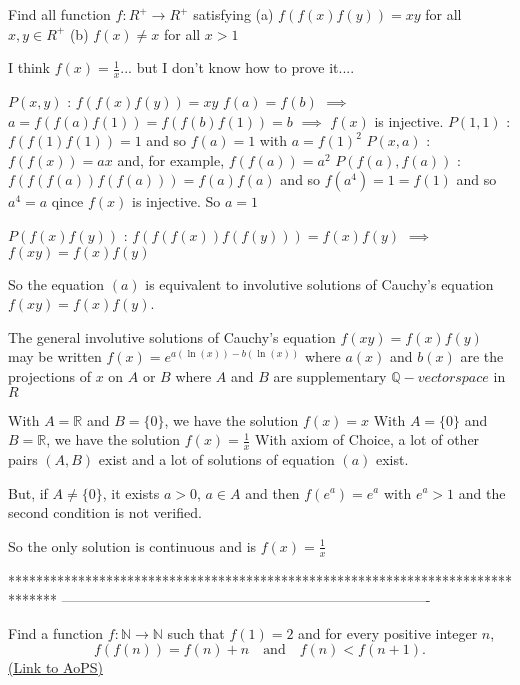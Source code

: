 \begin{mysolution}
	\begin{tcolorbox}Find all function $ f: R^{+}\to R^{+}$ satisfying
(a) $ f(f(x)f(y))=xy$ for all $ x, y \in R^{+}$
(b) $ f(x)\neq x$ for all $ x>1$

I think $ f(x)= \frac{1}{x}$... but I don't know how to prove it....\end{tcolorbox}

$ P(x,y)$ : $ f(f(x)f(y))=xy$
$ f(a)=f(b)$ $ \implies$ $ a=f(f(a)f(1))=f(f(b)f(1))=b$ $ \implies$ $ f(x)$ is injective.
$ P(1,1)$ : $ f(f(1)f(1))=1$ and so $ f(a)=1$ with $ a=f(1)^{2}$
$ P(x,a)$ : $ f(f(x))=ax$ and, for example, $ f(f(a))=a^{2}$
$ P(f(a),f(a))$ : $ f(f(f(a))f(f(a)))=f(a)f(a)$ and so $ f(a^{4})=1=f(1)$ and so $ a^{4}=a$ qince $ f(x)$ is injective. So $ a=1$

$ P(f(x)f(y))$ : $ f(f(f(x))f(f(y)))=f(x)f(y)$ $ \implies$ $ f(xy)=f(x)f(y)$

So the equation $ (a)$ is equivalent to involutive solutions of Cauchy's equation $ f(xy)=f(x)f(y)$.

The general involutive solutions of Cauchy's equation $ f(xy)=f(x)f(y)$ may be written $ f(x)=e^{a(\ln(x))-b(\ln(x))}$ where $ a(x)$ and $ b(x)$ are the projections of $ x$ on $ A$ or $ B$ where $ A$ and $ B$ are supplementary $ \mathbb{Q}-vector space$ in $ %
{R}$

With  ${ A=\mathbb{R}}$ and $ B=\{0\}$, we have the solution $ f(x)=x$
With $ A=\{0\}$ and $ B=\mathbb{R}$, we have the solution $ f(x)=\frac{1}{x}$
With axiom of Choice, a lot of other pairs $ (A,B)$ exist and a lot of solutions of equation $ (a)$ exist.

But, if $ A\neq\{0\}$, it exists $ a>0$, $ a\in A$ and then $ f(e^{a})=e^{a}$ with $ e^{a}>1$ and the second condition is not verified.

So the only solution is continuous and is $ f(x)=\frac{1}{x}$
\end{mysolution}
*******************************************************************************
-------------------------------------------------------------------------------

\begin{problem}
	Find a function $ f: \mathbb{N}\to \mathbb{N}$ such that $f(1)=2$ and for every positive integer $n$,
\[f(f(n))=f(n)+n \quad \text{and} \quad f(n)<f(n+1).\]
	\flushright \href{https://artofproblemsolving.com/community/c6h161454}{(Link to AoPS)}
\end{problem}



